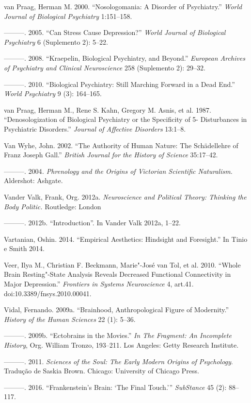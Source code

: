 van Praag, Herman M. 2000. ``Nosologomania: A Disorder of Psychiatry.''
\emph{World Journal of Biological Psychiatry} 1:151--158.

---------. 2005. ``Can Stress Cause Depression?'' \emph{World Journal of
Biological Psychiatry} 6 (Suplemento 2): 5--22.

---------. 2008. ``Kraepelin, Biological Psychiatry, and Beyond.''
\emph{European Archives of Psychiatry and Clinical Neuroscience} 258
(Suplemento 2): 29--32.

---------. 2010. ``Biological Psychiatry: Still Marching Forward in a
Dead End.'' \emph{World Psychiatry} 9 (3): 164--165.

van Praag, Herman M., Rene S. Kahn, Gregory M. Asnis, et al. 1987.
``Denosologization of Biological Psychiatry or the Specificity of 5-
Disturbances in Psychiatric Disorders.'' \emph{Journal of Affective
Disorders} 13:1--8.

Van Wyhe, John. 2002. ``The Authority of Human Nature: The Schädellehre
of Franz Joseph Gall.'' \emph{British Journal for the History of
Science} 35:17--42.

---------. 2004\emph{. Phrenology and the Origins of Victorian
Scientific Naturalism.} Aldershot: Ashgate.

Vander Valk, Frank, Org. 2012a. \emph{Neuroscience and Political Theory:
Thinking the Body Politic.} Routledge: London

---------. 2012b. ``Introduction''. In Vander Valk 2012a, 1--22.

Vartanian, Oshin. 2014. ``Empirical Aesthetics: Hindsight and
Foresight.'' In Tinio e Smith 2014.

Veer, Ilya M., Christian F. Beckmann, Marie"-José van Tol, et al. 2010.
``Whole Brain Resting"-State Analysis Reveals Decreased Functional
Connectivity in Major Depression.'' \emph{Frontiers in Systems
Neuroscience} 4, art.41. doi:10.3389/fnsys.2010.00041.

Vidal, Fernando. 2009a. ``Brainhood, Anthropological Figure of
Modernity.'' \emph{History of the Human Sciences} 22 (1): 5--36.

---------. 2009b. ``Ectobrains in the Movies.'' \emph{In The Fragment:
An Incomplete History}, Org. William Tronzo, 193--211. Los Angeles:
Getty Research Institute.

---------. 2011. \emph{Sciences of the Soul: The Early Modern Origins of
Psychology}. Tradução de Saskia Brown. Chicago: University of Chicago
Press.

---------. 2016. ``Frankenstein's Brain: `The Final Touch.'''
\emph{SubStance} 45 (2): 88--117.

